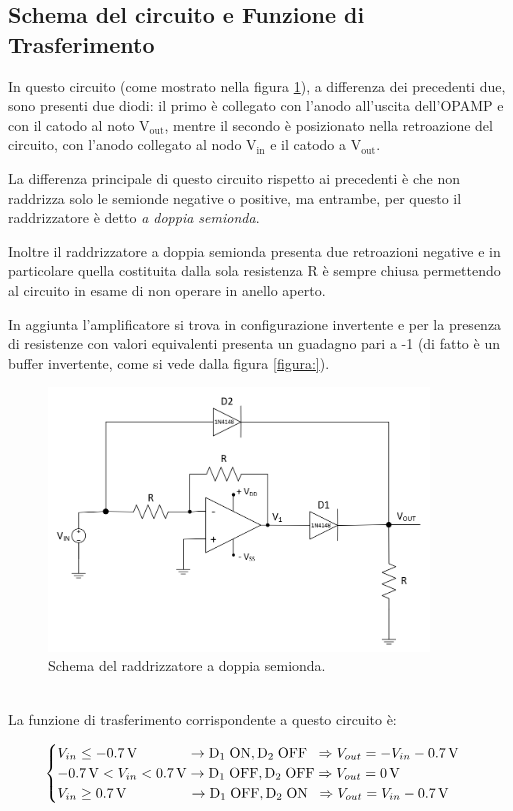 \documentclass{report}
\begin{document}
\subsection{Schema del circuito e Funzione di Trasferimento}
In questo circuito (come mostrato nella figura \ref{figura:schema3}), a differenza dei precedenti due, sono presenti due diodi: il primo è collegato con l'anodo all'uscita dell'OPAMP e con il catodo al noto $\displaystyle\mathrm{V_{out}}$, mentre il secondo è posizionato nella retroazione del circuito, con l'anodo collegato al nodo $\displaystyle\mathrm{V_{in}}$ e il catodo a $\displaystyle\mathrm{V_{out}}$.\par
La differenza principale di questo circuito rispetto ai precedenti è che non raddrizza solo le semionde negative o positive, ma entrambe, per questo il raddrizzatore è detto \textit{a doppia semionda}. \par
Inoltre il raddrizzatore a doppia semionda presenta due retroazioni negative e in particolare quella costituita dalla sola resistenza R è sempre chiusa permettendo al circuito in esame di non operare in anello aperto.\par %
In aggiunta l'amplificatore si trova in configurazione invertente e per la presenza di resistenze con valori equivalenti presenta un guadagno pari a -1 (di fatto è un buffer invertente, come si vede dalla figura \ref{figura:}). %
\begin{figure}[h]
	\centering
	\includegraphics[height=7cm]{immagini/schema3}
	\caption{Schema del raddrizzatore a doppia semionda.}
	\label{figura:schema3}
\end{figure}
\\La funzione di trasferimento corrispondente a questo circuito è:

\begin{equation}
   \begin{cases}
   V_{in}\le \SI{-0.7}{\volt}\;\;\indent\indent\rightarrow \mathrm{D_1\; ON, D_2\;OFF}\;\; \Rightarrow V_{out} = -V_{in}-\SI{0.7}{\volt}\\
  \SI{-0.7}{\volt} < V_{in}< \SI{0.7}{\volt}\rightarrow \mathrm{D_1\; OFF, D_2\;OFF} \Rightarrow V_{out} = \SI{0}{\volt}\\
   V_{in}\ge \SI{0.7}{\volt}\;\;\;\;\;\indent\indent\rightarrow \mathrm{D_1\; OFF, D_2\;ON}\;\; \Rightarrow V_{out} = V_{in}-\SI{0.7}{\volt}
   \end{cases}
\end{equation}
\end{document}
